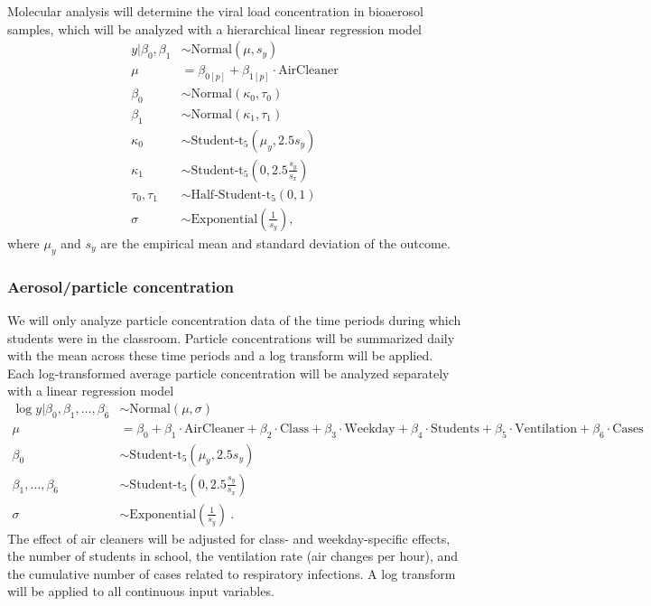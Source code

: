 \documentclass{article}
\begin{document}
Molecular analysis will determine the viral load concentration in bioaerosol samples, which will be analyzed with a hierarchical linear regression model 
\begin{align*}
    y | \beta_0, \beta_1 &\sim \text{Normal}(\mu,s_{y}) \\
    \mu &= \beta_{0[p]} + \beta_{1[p]} \cdot \text{AirCleaner} \\
    \beta_0 &\sim \text{Normal}(\kappa_0, \tau_0) \\
    \beta_1 &\sim \text{Normal}(\kappa_1, \tau_1) \\
    \kappa_0 &\sim \text{Student-t}_5(\mu_{y}, 2.5s_{y}) \\
    \kappa_1 &\sim \text{Student-t}_5\left(0, 2.5\frac{s_{y}}{s_{x}}\right) \\
    \tau_0, \tau_1 &\sim \text{Half-Student-t}_5(0,1) \\
    \sigma &\sim \text{Exponential}\left(\frac{1}{s_{y}}\right),
\end{align*}
where $\mu_{y}$ and $s_{y}$ are the empirical mean and standard deviation of the outcome. 

\subsubsection{Aerosol/particle concentration}\label{subsubsec:aerosol}

We will only analyze particle concentration data of the time periods during which students were in the classroom. Particle concentrations will be summarized daily with the mean across these time periods and a log transform will be applied. Each log-transformed average particle concentration will be analyzed separately with a linear regression model 
\begin{align*}
    \log y | \beta_0, \beta_1, \dots, \beta_6 &\sim \text{Normal}(\mu,\sigma) \\
    \mu &= \beta_0 + \beta_1 \cdot \text{AirCleaner} + \beta_2 \cdot \text{Class} + \beta_3 \cdot \text{Weekday} + \beta_4 \cdot \text{Students} + \beta_5 \cdot \text{Ventilation} + \beta_6 \cdot \text{Cases}\\
    \beta_0 &\sim \text{Student-t}_5(\mu_y, 2.5s_{y}) \\
    \beta_1, \dots, \beta_6 &\sim \text{Student-t}_5\left(0, 2.5\frac{s_{y}}{s_{x}}\right) \\
    \sigma &\sim \text{Exponential}\left(\frac{1}{s_{y}}\right)~.
\end{align*}
The effect of air cleaners will be adjusted for class- and weekday-specific effects, the number of students in school, the ventilation rate (air changes per hour), and the cumulative number of cases related to respiratory infections. A log transform will be applied to all continuous input variables. 
\end{document}
